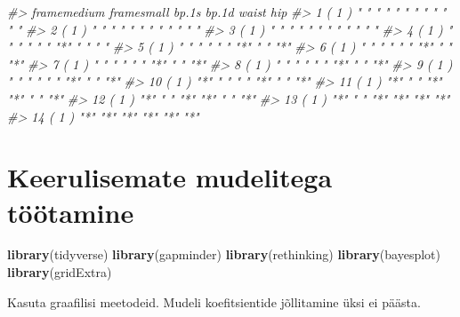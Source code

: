 \documentclass[]{book}
\newenvironment{Shaded}{\begin{snugshade}}{\end{snugshade}}
\newcommand{\KeywordTok}[1]{\textcolor[rgb]{0.13,0.29,0.53}{\textbf{#1}}}
\newcommand{\DataTypeTok}[1]{\textcolor[rgb]{0.13,0.29,0.53}{#1}}
\newcommand{\DecValTok}[1]{\textcolor[rgb]{0.00,0.00,0.81}{#1}}
\newcommand{\StringTok}[1]{\textcolor[rgb]{0.31,0.60,0.02}{#1}}
\newcommand{\CommentTok}[1]{\textcolor[rgb]{0.56,0.35,0.01}{\textit{#1}}}
\newcommand{\OperatorTok}[1]{\textcolor[rgb]{0.81,0.36,0.00}{\textbf{#1}}}
\newcommand{\NormalTok}[1]{#1}
\begin{document}
\begin{Shaded}
\begin{Highlighting}[]
\CommentTok{#>           framemedium framesmall bp.1s bp.1d waist hip}
\CommentTok{#> 1  ( 1 )  " "         " "        " "   " "   " "   " "}
\CommentTok{#> 2  ( 1 )  " "         " "        " "   " "   " "   " "}
\CommentTok{#> 3  ( 1 )  " "         " "        " "   " "   " "   " "}
\CommentTok{#> 4  ( 1 )  " "         " "        " "   "*"   " "   " "}
\CommentTok{#> 5  ( 1 )  " "         " "        " "   "*"   " "   "*"}
\CommentTok{#> 6  ( 1 )  " "         " "        " "   "*"   " "   "*"}
\CommentTok{#> 7  ( 1 )  " "         " "        " "   "*"   " "   "*"}
\CommentTok{#> 8  ( 1 )  " "         " "        " "   "*"   " "   "*"}
\CommentTok{#> 9  ( 1 )  " "         " "        " "   "*"   " "   "*"}
\CommentTok{#> 10  ( 1 ) "*"         " "        " "   "*"   " "   "*"}
\CommentTok{#> 11  ( 1 ) "*"         " "        "*"   "*"   " "   "*"}
\CommentTok{#> 12  ( 1 ) "*"         " "        "*"   "*"   " "   "*"}
\CommentTok{#> 13  ( 1 ) "*"         " "        "*"   "*"   "*"   "*"}
\CommentTok{#> 14  ( 1 ) "*"         "*"        "*"   "*"   "*"   "*"}
\end{Highlighting}
\end{Shaded}

\chapter{Keerulisemate mudelitega
töötamine}\label{keerulisemate-mudelitega-tootamine}

\begin{Shaded}
\begin{Highlighting}[]
\KeywordTok{library}\NormalTok{(tidyverse)}
\KeywordTok{library}\NormalTok{(gapminder)}
\KeywordTok{library}\NormalTok{(rethinking)}
\KeywordTok{library}\NormalTok{(bayesplot)}
\KeywordTok{library}\NormalTok{(gridExtra)}
\end{Highlighting}
\end{Shaded}

Kasuta graafilisi meetodeid. Mudeli koefitsientide jõllitamine üksi ei
päästa.

\begin{Shaded}
\end{Shaded}
\end{document}
